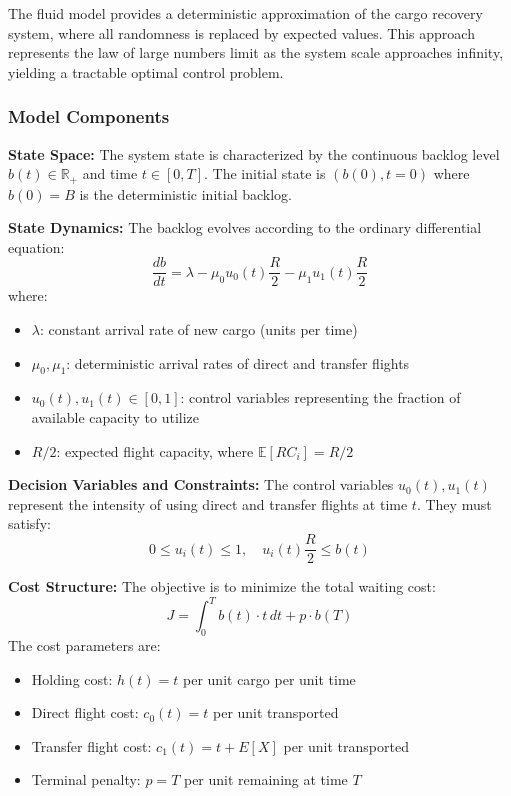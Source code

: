 \documentclass[opre,sglanonrev]{informs4}
\begin{document}
{\color{brown}
The fluid model provides a deterministic approximation of the cargo recovery system, where all randomness is replaced by expected values. This approach represents the law of large numbers limit as the system scale approaches infinity, yielding a tractable optimal control problem.

\subsubsection{Model Components}

\textbf{State Space:} The system state is characterized by the continuous backlog level \( b(t) \in \mathbb{R}_+ \) and time \( t \in [0, T] \). The initial state is \( (b(0), t=0) \) where \( b(0) = B \) is the deterministic initial backlog.

\textbf{State Dynamics:} The backlog evolves according to the ordinary differential equation:
\[
\frac{db}{dt} = \lambda - \mu_0 u_0(t) \frac{R}{2} - \mu_1 u_1(t) \frac{R}{2}
\]
where:
\begin{itemize}
    \item \( \lambda \): constant arrival rate of new cargo (units per time)
    \item \( \mu_0, \mu_1 \): deterministic arrival rates of direct and transfer flights
    \item \( u_0(t), u_1(t) \in [0,1] \): control variables representing the fraction of available capacity to utilize
    \item \( R/2 \): expected flight capacity, where \( \mathbb{E}[RC_i] = R/2 \)
\end{itemize}

\textbf{Decision Variables and Constraints:} The control variables \( u_0(t), u_1(t) \) represent the intensity of using direct and transfer flights at time \( t \). They must satisfy:
\[
0 \leq u_i(t) \leq 1, \quad u_i(t) \frac{R}{2} \leq b(t)
\]

\textbf{Cost Structure:} The objective is to minimize the total waiting cost:
\[
J = \int_0^T b(t) \cdot t \, dt + p \cdot b(T)
\]
The cost parameters are:
\begin{itemize}
    \item Holding cost: \( h(t) = t \) per unit cargo per unit time
    \item Direct flight cost: \( c_0(t) = t \) per unit transported
    \item Transfer flight cost: \( c_1(t) = t + E[X] \) per unit transported
    \item Terminal penalty: \( p = T \) per unit remaining at time \( T \)
\end{itemize}

}
\end{document}
